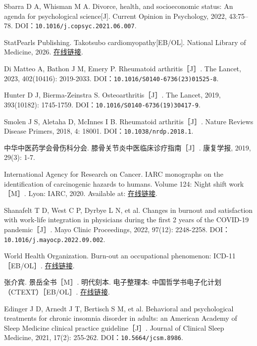 \begin{enumerate}[label={[Q\arabic*]},leftmargin=*]
  \item Sbarra D A, Whisman M A. Divorce, health, and socioeconomic status: An agenda for psychological science[J]. Current Opinion in Psychology, 2022, 43:75–78. DOI：\nolinkurl{10.1016/j.copsyc.2021.06.007}.
  \item StatPearls Publishing. Takotsubo cardiomyopathy[EB/OL]. National Library of Medicine, 2026. \href{https://www.ncbi.nlm.nih.gov/books/NBK430798/}{在线链接}.
  \item Di Matteo A, Bathon J M, Emery P. Rheumatoid arthritis［J］. The Lancet, 2023, 402(10416): 2019-2033. DOI：\nolinkurl{10.1016/S0140-6736(23)01525-8}.
  \item Hunter D J, Bierma-Zeinstra S. Osteoarthritis［J］. The Lancet, 2019, 393(10182): 1745-1759. DOI：\nolinkurl{10.1016/S0140-6736(19)30417-9}.
  \item Smolen J S, Aletaha D, McInnes I B. Rheumatoid arthritis［J］. Nature Reviews Disease Primers, 2018, 4: 18001. DOI：\nolinkurl{10.1038/nrdp.2018.1}.
  \item 中华中医药学会骨伤科分会. 膝骨关节炎中医临床诊疗指南［J］. 康复学报, 2019, 29(3): 1-7.
  \item International Agency for Research on Cancer. IARC monographs on the identification of carcinogenic hazards to humans. Volume 124: Night shift work［M］. Lyon: IARC, 2020. Available at: \href{https://publications.iarc.who.int/Book-And-Report-Series/Iarc-Monographs-On-The-Identification-Of-Carcinogenic-Hazards-To-Humans/Night-Shift-Work-2020}{在线链接}.
  \item Shanafelt T D, West C P, Dyrbye L N, et al. Changes in burnout and satisfaction with work-life integration in physicians during the first 2 years of the COVID-19 pandemic［J］. Mayo Clinic Proceedings, 2022, 97(12): 2248-2258. DOI：\nolinkurl{10.1016/j.mayocp.2022.09.002}.
  \item World Health Organization. Burn-out an occupational phenomenon: ICD-11［EB/OL］. \href{https://www.who.int/standards/classifications/frequently-asked-questions/burn-out-an-occupational-phenomenon}{在线链接}.
  \item 张介宾. 景岳全书［M］. 明代刻本. 电子整理本: 中国哲学书电子化计划（CTEXT）［EB/OL］. \href{https://zh.wikisource.org/zh-hans/景岳全書_(四庫全書本)/卷18}{在线链接}.
  \item Edinger J D, Arnedt J T, Bertisch S M, et al. Behavioral and psychological treatments for chronic insomnia disorder in adults: an American Academy of Sleep Medicine clinical practice guideline［J］. Journal of Clinical Sleep Medicine, 2021, 17(2): 255-262. DOI：\nolinkurl{10.5664/jcsm.8986}.

\end{enumerate}
